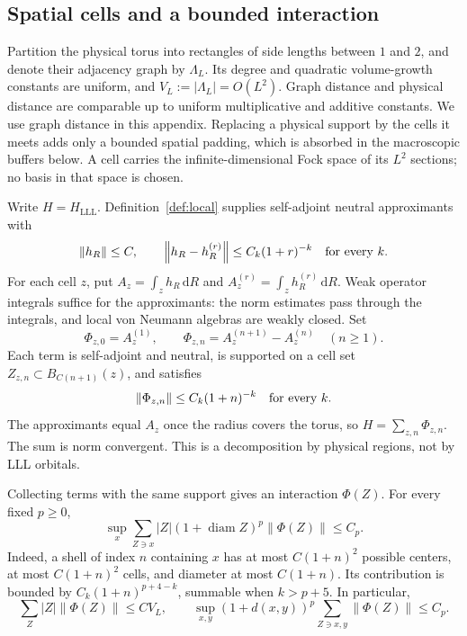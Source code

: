 \documentclass[11pt]{article}
\theoremstyle{definition}
\theoremstyle{remark}
\newcommand{\dd}{\,\mathrm d}
\newcommand{\norm}[1]{\left\lVert#1\right\rVert}
\newcommand{\diam}{\operatorname{diam}}
\begin{document}
\subsection{Spatial cells and a bounded interaction}

Partition the physical torus into rectangles of side lengths
between \(1\) and \(2\), and denote their adjacency graph by
\(\Lambda_L\).  Its degree and quadratic volume-growth constants
are uniform, and \(V_L:=|\Lambda_L|=O(L^2)\).
Graph distance and physical distance are comparable up to uniform
multiplicative and additive constants.  We use graph distance in
this appendix.  Replacing a physical support by the cells it meets
adds only a bounded spatial padding, which is absorbed in the
macroscopic buffers below.  A cell carries the infinite-dimensional
Fock space of its \(L^2\) sections; no basis in that space is chosen.

Write \(H=H_{\mathrm{LLL}}\).  Definition~\ref{def:local} supplies
self-adjoint neutral approximants with
\begin{equation}\label{eq:kapprox}
 \norm{h_R}\le C,\qquad
 \norm{h_R-h_R^{(r)}}\le C_k(1+r)^{-k}
 \quad\hbox{for every }k.
\end{equation}
For each cell \(z\), put \(A_z=\int_z h_R\dd R\) and
\(A_z^{(r)}=\int_z h_R^{(r)}\dd R\).  Weak operator integrals
suffice for the approximants: the norm estimates pass through the
integrals, and local von Neumann algebras are weakly closed.
Set
\[
 \Phi_{z,0}=A_z^{(1)},\qquad
 \Phi_{z,n}=A_z^{(n+1)}-A_z^{(n)}\quad(n\ge1).
\]
Each term is self-adjoint and neutral, is supported on a cell set
\(Z_{z,n}\subset B_{C(n+1)}(z)\), and satisfies
\[
 \norm{\Phi_{z,n}}\le C_k(1+n)^{-k}
 \quad\hbox{for every }k.
\]
The approximants equal \(A_z\) once the radius covers the torus,
so \(H=\sum_{z,n}\Phi_{z,n}\).  The sum is norm convergent.
This is a decomposition by physical regions, not by LLL orbitals.

Collecting terms with the same support gives an interaction
\(\Phi(Z)\).  For every fixed \(p\ge0\),
\begin{equation}\label{eq:polysummability}
 \sup_x\sum_{Z\ni x}|Z|(1+\diam Z)^p\norm{\Phi(Z)}
 \le C_p.
\end{equation}
Indeed, a shell of index \(n\) containing \(x\) has at most
\(C(1+n)^2\) possible centers, at most \(C(1+n)^2\) cells,
and diameter at most \(C(1+n)\).  Its contribution is bounded
by \(C_k(1+n)^{p+4-k}\), summable when \(k>p+5\).
In particular,
\[
 \sum_Z|Z|\norm{\Phi(Z)}\le CV_L,\qquad
 \sup_{x,y}(1+d(x,y))^p\sum_{Z\ni x,y}\norm{\Phi(Z)}
 \le C_p.
\]
\end{document}
